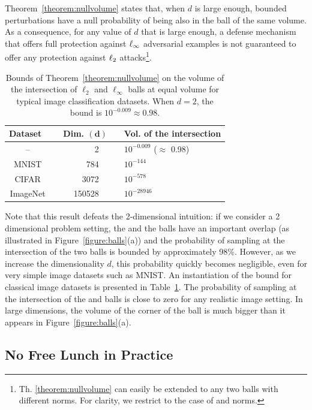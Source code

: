 Theorem~\ref{theorem:nullvolume} states that, when $d$ is large enough, \ltwo bounded perturbations have a null probability of being also in the \linf ball of the same volume. As a consequence, for any value of $d$ that is large enough, a defense mechanism that offers full protection against $\ell_\infty$ adversarial examples is not guaranteed to offer any protection against $\ell_2$ attacks\footnote{Th. \ref{theorem:nullvolume} can easily be extended to any two balls with different norms. For clarity, we restrict to the case of \linf and \ltwo norms.}.

\begin{table}[ht]
\centering
\caption{ Bounds of Theorem~\ref{theorem:nullvolume} on the volume of the intersection of  $\ell_2$ and $\ell_\infty$ balls at equal volume for typical image classification datasets. When $d=2$, the bound is $ 10^{-0.009}\approx 0.98$.}
\begin{tabular}{c r r r l}
\toprule
\textbf{Dataset\ } & \phantom{....} & \textbf{Dim.} $\mathbf{(d)}$ & \phantom{....} & \textbf{Vol. of the intersection }\\
\midrule
-- & & 2\ \ & & $10^{-0.009}$ \quad ($\approx$ 0.98) \\
MNIST & & 784\ \  & & $10^{-144}$\\
CIFAR & & 3072\ \ & &  $10^{-578}$\\
ImageNet & & 150528\ \ & & $10^{-28946}$\\
\bottomrule
\end{tabular}
\label{table:datadim}
\end{table}

Note that this result defeats the 2-dimensional intuition: if we consider a 2 dimensional problem setting, the \linf and the \ltwo balls have an important overlap (as illustrated in Figure~\ref{figure:balls}(a)) and the probability of sampling at the intersection of the two balls is bounded by approximately 98\%. However, as we increase the dimensionality $d$, this probability quickly becomes negligible, even for very simple image datasets such as MNIST. An instantiation of  the bound for classical image datasets is presented in Table~\ref{table:datadim}. The probability of sampling at the intersection of the \linf and \ltwo balls is close to zero for any realistic image setting. In large dimensions, the volume of the corner of the \linf ball is much bigger than it appears in Figure~\ref{figure:balls}(a).


\subsection{No Free Lunch in Practice}

